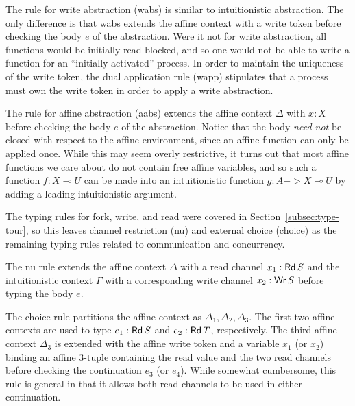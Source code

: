 The rule for write abstraction (wabs) is similar to intuitionistic
abstraction. The only difference is that wabs extends the affine context with a
write token before checking the body $e$ of the abstraction. Were it not for
write abstraction, all functions would be initially read-blocked, and so one
would not be able to write a function for an ``initially activated'' process. In
order to maintain the uniqueness of the write token, the dual application rule
(wapp) stipulates that a process must own the write token in order to apply a
write abstraction.

The rule for affine abstraction (aabs) extends the affine context $\Delta$ with $x :
X$ before checking the body $e$ of the abstraction. Notice that the
body \emph{need not} be closed with respect to the affine environment, since an
affine function can only be applied once. While this may seem overly
restrictive, it turns out that most affine functions we care about do not
contain free affine variables, and so such a function $f : X \multimap U$ can be made
into an intuitionistic function $g : A -> X \multimap U$ by adding a leading
intuitionistic argument.

The typing rules for fork, write, and read were covered in
Section~\ref{subsec:type-tour}, so this leaves channel restriction (nu) and
external choice (choice) as the remaining typing rules related to communication
and concurrency.

The nu rule extends the affine context $\Delta$ with a read channel
$x_1 : \textnormal{\textsf{Rd}}\,S$ and the intuitionistic context $\Gamma$ with a corresponding write
channel $x_2 : \textnormal{\textsf{Wr}}\,S$ before typing the body $e$.

The choice rule partitions the affine context as $\Delta_1,\Delta_2,\Delta_3$. The first two
affine contexts are used to type $e_1 : \textnormal{\textsf{Rd}}\,S$ and $e_2 : \textnormal{\textsf{Rd}}\,T$,
respectively. The third affine context $\Delta_3$ is extended with the affine write
token and a variable $x_1$ (or $x_2$) binding an affine 3-tuple containing the
read value and the two read channels before checking the continuation $e_3$ (or
$e_4$). While somewhat cumbersome, this rule is general in that it allows both
read channels to be used in either continuation.


